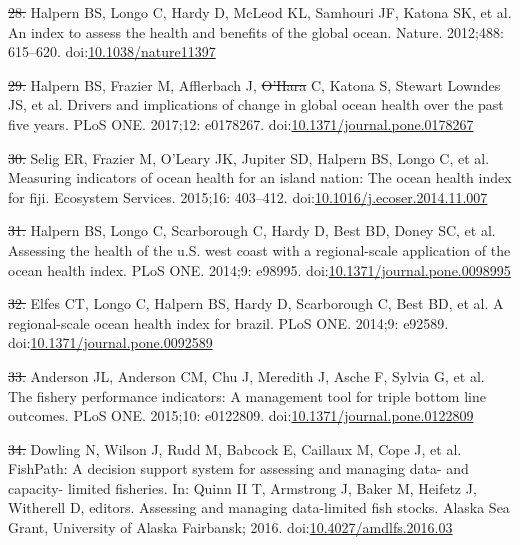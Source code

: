 \documentclass[12pt,]{article}
\providecommand{\DIFaddtex}[1]{{\protect\color{blue}\uwave{#1}}} %
\providecommand{\DIFdeltex}[1]{{\protect\color{red}\sout{#1}}}                      %
\providecommand{\DIFaddbegin}{} %
\providecommand{\DIFaddend}{} %
\providecommand{\DIFdelbegin}{} %
\providecommand{\DIFdelend}{} %
\providecommand{\DIFadd}[1]{\texorpdfstring{\DIFaddtex{#1}}{#1}} %
\providecommand{\DIFdel}[1]{\texorpdfstring{\DIFdeltex{#1}}{}} %
\newcommand{\DIFscaledelfig}{0.5}
\newlength{\DIFdelgraphicswidth} %
\newlength{\DIFdelgraphicsheight} %
\newcommand{\DIFaddincludegraphics}[2][]{{\color{blue}\fbox{\DIFOincludegraphics[#1]{#2}}}} %
\newcommand{\DIFdelincludegraphics}[2][]{%
\sbox{\DIFdelgraphicsbox}{\DIFOincludegraphics[#1]{#2}}%
\settoboxwidth{\DIFdelgraphicswidth}{\DIFdelgraphicsbox} %
\settoboxtotalheight{\DIFdelgraphicsheight}{\DIFdelgraphicsbox} %
\scalebox{\DIFscaledelfig}{%
\parbox[b]{\DIFdelgraphicswidth}{\usebox{\DIFdelgraphicsbox}\\[-\baselineskip] \rule{\DIFdelgraphicswidth}{0em}}\llap{\resizebox{\DIFdelgraphicswidth}{\DIFdelgraphicsheight}{%
\setlength{\unitlength}{\DIFdelgraphicswidth}%
\begin{picture}(1,1)%
\thicklines\linethickness{2pt} %
{\color[rgb]{1,0,0}\put(0,0){\framebox(1,1){}}}%
{\color[rgb]{1,0,0}\put(0,0){\line( 1,1){1}}}%
{\color[rgb]{1,0,0}\put(0,1){\line(1,-1){1}}}%
\end{picture}%
}\hspace*{3pt}}} %
} %
\DeclareRobustCommand{\DIFaddbegin}{\DIFOaddbegin \let\includegraphics\DIFaddincludegraphics} %
\DeclareRobustCommand{\DIFaddend}{\DIFOaddend \let\includegraphics\DIFOincludegraphics} %
\DeclareRobustCommand{\DIFdelbegin}{\DIFOdelbegin \let\includegraphics\DIFdelincludegraphics} %
\DeclareRobustCommand{\DIFdelend}{\DIFOaddend \let\includegraphics\DIFOincludegraphics} %
\begin{document}
\hypertarget{ref-halpern_2012-k9}{}
\DIFdelbegin \DIFdel{28. }\DIFdelend \DIFaddbegin \DIFadd{29. }\DIFaddend Halpern BS, Longo C, Hardy D, McLeod KL, Samhouri JF, Katona SK, et
al. An index to assess the health and benefits of the global ocean.
Nature. 2012;488: 615--620.
doi:\href{https://doi.org/10.1038/nature11397}{10.1038/nature11397}

\hypertarget{ref-halpern_2017-Zi}{}
\DIFdelbegin \DIFdel{29. }\DIFdelend \DIFaddbegin \DIFadd{30. }\DIFaddend Halpern BS, Frazier M, Afflerbach J, \DIFdelbegin \DIFdel{O'Hara }\DIFdelend \DIFaddbegin \DIFadd{OHara }\DIFaddend C, Katona S, Stewart
Lowndes JS, et al. Drivers and implications of change in global ocean
health over the past five years. PLoS ONE. 2017;12: e0178267.
doi:\href{https://doi.org/10.1371/journal.pone.0178267}{10.1371/journal.pone.0178267}

\hypertarget{ref-selig_2015-F9}{}
\DIFdelbegin \DIFdel{30. }\DIFdelend \DIFaddbegin \DIFadd{31. }\DIFaddend Selig ER, Frazier M, O'Leary JK, Jupiter SD, Halpern BS, Longo C, et
al. Measuring indicators of ocean health for an island nation: The ocean
health index for fiji. Ecosystem Services. 2015;16: 403--412.
doi:\href{https://doi.org/10.1016/j.ecoser.2014.11.007}{10.1016/j.ecoser.2014.11.007}

\hypertarget{ref-halpern_2014-lQ}{}
\DIFdelbegin \DIFdel{31. }\DIFdelend \DIFaddbegin \DIFadd{32. }\DIFaddend Halpern BS, Longo C, Scarborough C, Hardy D, Best BD, Doney SC, et
al. Assessing the health of the u.S. west coast with a regional-scale
application of the ocean health index. PLoS ONE. 2014;9: e98995.
doi:\href{https://doi.org/10.1371/journal.pone.0098995}{10.1371/journal.pone.0098995}

\hypertarget{ref-elfes_2014-RC}{}
\DIFdelbegin \DIFdel{32. }\DIFdelend \DIFaddbegin \DIFadd{33. }\DIFaddend Elfes CT, Longo C, Halpern BS, Hardy D, Scarborough C, Best BD, et
al. A regional-scale ocean health index for brazil. PLoS ONE. 2014;9:
e92589.
doi:\href{https://doi.org/10.1371/journal.pone.0092589}{10.1371/journal.pone.0092589}

\hypertarget{ref-anderson_2015-ND}{}
\DIFdelbegin \DIFdel{33. }\DIFdelend \DIFaddbegin \DIFadd{34. }\DIFaddend Anderson JL, Anderson CM, Chu J, Meredith J, Asche F, Sylvia G, et
al. The fishery performance indicators: A management tool for triple
bottom line outcomes. PLoS ONE. 2015;10: e0122809.
doi:\href{https://doi.org/10.1371/journal.pone.0122809}{10.1371/journal.pone.0122809}

\hypertarget{ref-dowling_2016-pO}{}
\DIFdelbegin \DIFdel{34. }\DIFdelend \DIFaddbegin \DIFadd{35. }\DIFaddend Dowling N, Wilson J, Rudd M, Babcock E, Caillaux M, Cope J, et al.
FishPath: A decision support system for assessing and managing data- and
capacity- limited fisheries. In: Quinn II T, Armstrong J, Baker M,
Heifetz J, Witherell D, editors. Assessing and managing data-limited
fish stocks. Alaska Sea Grant, University of Alaska Fairbansk; 2016.
doi:\href{https://doi.org/10.4027/amdlfs.2016.03}{10.4027/amdlfs.2016.03}
\end{document}
